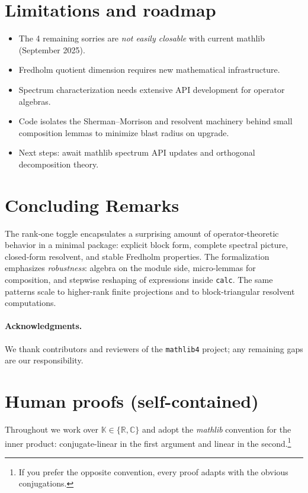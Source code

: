 \documentclass[11pt]{article}
\theoremstyle{definition}
\newcommand{\K}{\mathbb{K}}
\newcommand{\R}{\mathbb{R}}
\newcommand{\C}{\mathbb{C}}
\begin{document}
\section{Limitations and roadmap}
\begin{itemize}
\item The 4 remaining sorries are \emph{not easily closable} with current mathlib (September 2025).
\item Fredholm quotient dimension requires new mathematical infrastructure.
\item Spectrum characterization needs extensive API development for operator algebras.
\item Code isolates the Sherman--Morrison and resolvent machinery behind small composition lemmas to minimize blast radius on upgrade.
\item Next steps: await mathlib spectrum API updates and orthogonal decomposition theory.
\end{itemize}

\section{Concluding Remarks}

The rank‑one toggle encapsulates a surprising amount of operator‑theoretic behavior in a minimal package: explicit block form, complete spectral picture, closed‑form resolvent, and stable Fredholm properties. The formalization emphasizes \emph{robustness}: algebra on the module side, micro-lemmas for composition, and stepwise reshaping of expressions inside \texttt{calc}. The same patterns scale to higher-rank finite projections and to block-triangular resolvent computations.

\paragraph{Acknowledgments.}
We thank contributors and reviewers of the \texttt{mathlib4} project; any remaining gaps are our responsibility.

\appendix
\section{Human proofs (self-contained)}\label{sec:human-proofs}

Throughout we work over $\K\in\{\R,\C\}$ and adopt the \emph{mathlib} convention for the inner product: conjugate-linear in the first argument and linear in the second.\footnote{If you prefer the opposite convention, every proof adapts with the obvious conjugations.}
\end{document}
